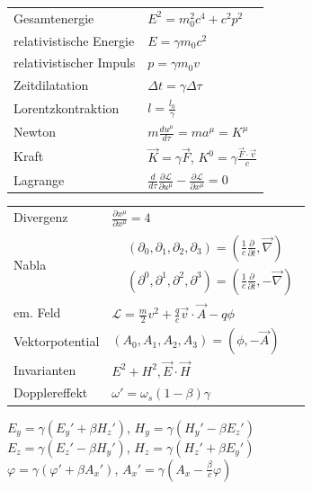 \documentclass[12pt,a4paper]{article}
\renewcommand{\d}[2]{\frac{d #1}{d #2}}
\newcommand{\pd}[2]{\frac{\partial #1}{\partial #2}}
\renewcommand{\=}[1]{\stackrel{#1}{=}}
\theoremstyle{definition}
\theoremstyle{remark}
\begin{document}
\begin{center}
\begin{minipage}[t]{.5\linewidth}
\vspace{0pt}

\begin{tabular}{ll}

Gesamtenergie & $E^2 = m_0^2 c^4 + c^2p^2$\\
relativistische Energie & $E = \gamma m_0 c^2$\\
relativistischer Impuls & $p = \gamma m_0 v$\\
Zeitdilatation & $\Delta t = \gamma \Delta \tau$\\
Lorentzkontraktion & $l = \frac{l_0}{\gamma}$\\
Newton & $m \d{u^{\mu}}{\tau} = ma^{\mu} = K^{\mu}$\\
Kraft & $\vec{K} = \gamma \vec{F}$, $K^0 = \gamma \frac{\vec{F} \cdot \vec{v}}{c}$\\
Lagrange & $\d{}{\tau} \pd{\mathscr{L}}{u^{\mu}} - \pd{\mathscr{L}}{x^{\mu}} = 0$\\
\end{tabular}

\end{minipage}%
\begin{minipage}[t]{.5\linewidth}
\vspace{0pt}
\centering
\begin{tabular}{ll}
Divergenz & $\pd{x^{\mu}}{x^{\mu}} = 4$\\
Nabla & $\begin{aligned} &(\partial_0, \partial_1, \partial_2, \partial_3) = (\frac{1}{c} \pd{}{t}, \vec{\nabla})\\
&(\partial^0, \partial^1, \partial^2, \partial^3) = (\frac{1}{c} \pd{}{t}, -\vec{\nabla})\end{aligned}$\\
em. Feld & $\mathscr{L} = \frac{m}{2} v^2 + \frac{q}{c} \vec{v} \cdot \vec{A} - q \phi$\\
Vektorpotential & $(A_0, A_1, A_2, A_3) = (\phi, - \vec{A})$\\
Invarianten & $E^2 + H^2, \vec E \cdot \vec H$\\
Dopplereffekt & $\omega' = \omega_s (1-\beta)\gamma$\\
\end{tabular}

\begin{framed}
$E_y = \gamma (E_y' + \beta H_z')$, $H_y = \gamma (H_y' - \beta E_z')$\\
$E_z = \gamma (E_z' - \beta H_y')$, $H_z = \gamma (H_z' + \beta E_y')$\\
$\varphi = \gamma(\varphi' + \beta A_x')$, $A_x' = \gamma(A_x - \frac{\beta}{c} \varphi)$
\end{framed}

\end{minipage}
\end{center}
\end{document}
